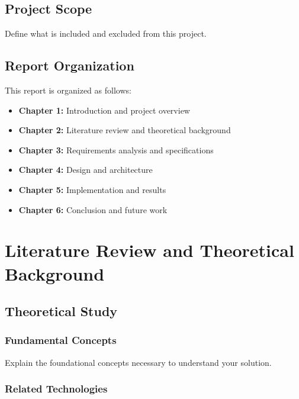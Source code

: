 \documentclass[12pt,a4paper,onecolumn,oneside]{report}
\begin{document}
\section{Project Scope}
\label{sec:intro:scope}

Define what is included and excluded from this project.

\section{Report Organization}
\label{sec:intro:organization}

This report is organized as follows:
\begin{itemize}
    \item \textbf{Chapter 1:} Introduction and project overview
    \item \textbf{Chapter 2:} Literature review and theoretical background
    \item \textbf{Chapter 3:} Requirements analysis and specifications
    \item \textbf{Chapter 4:} Design and architecture
    \item \textbf{Chapter 5:} Implementation and results
    \item \textbf{Chapter 6:} Conclusion and future work
\end{itemize}


\chapter{Literature Review and Theoretical Background}
\label{chap:literature}

\section{Theoretical Study}
\label{sec:theory}

\subsection{Fundamental Concepts}
\label{sec:theory:concepts}

Explain the foundational concepts necessary to understand your solution.

\subsection{Related Technologies}
\label{sec:theory:tech}
\end{document}
